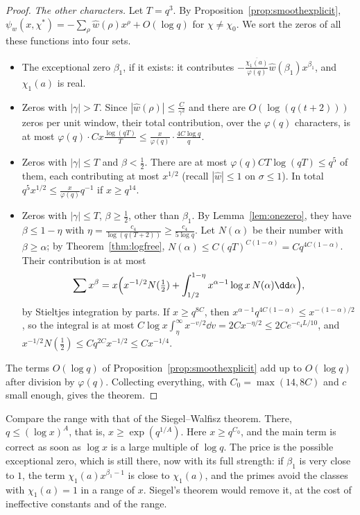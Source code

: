 \begin{proof}
\emph{The other characters.} Let $T=q^3$. By Proposition~\ref{prop:smoothexplicit}, $\psi_w(x,\chi^*)=-\sum_\rho\hat w(\rho)x^\rho+O(\log q)$ for $\chi\ne\chi_0$. We sort the zeros of all these functions into four sets.
\begin{itemize}
\item The exceptional zero $\beta_1$, if it exists: it contributes $-\frac{\overline{\chi_1(a)}}{\varphi(q)}\hat w(\beta_1)x^{\beta_1}$, and $\chi_1(a)$ is real.
\item Zeros with $|\gamma|>T$. Since $|\hat w(\rho)|\le\frac{C}{\gamma^2}$ and there are $O(\log(q(t+2)))$ zeros per unit window, their total contribution, over the $\varphi(q)$ characters, is at most $\varphi(q)\cdot Cx\frac{\log(qT)}T\le\frac x{\varphi(q)}\cdot\frac{4C\log q}q$.
\item Zeros with $|\gamma|\le T$ and $\beta<\frac12$. There are at most $\varphi(q)CT\log(qT)\le q^5$ of them, each contributing at most $x^{1/2}$ (recall $|\hat w|\le1$ on $\sigma\le1$). In total $q^5x^{1/2}\le\frac x{\varphi(q)}q^{-1}$ if $x\ge q^{14}$.
\item Zeros with $|\gamma|\le T$, $\beta\ge\frac12$, other than $\beta_1$. By Lemma~\ref{lem:onezero}, they have $\beta\le1-\eta$ with $\eta=\frac{c_4}{\log(q(T+2))}\ge\frac{c_4}{5\log q}$. Let $N(\alpha)$ be their number with $\beta\ge\alpha$; by Theorem~\ref{thm:logfree}, $N(\alpha)\le C(qT)^{C(1-\alpha)}=Cq^{4C(1-\alpha)}$. Their contribution is at most
\[
\sum x^\beta=x\Bigl(x^{-1/2}N(\tfrac12)+\int_{1/2}^{1-\eta}x^{\alpha-1}\log x\,N(\alpha)\dd\alpha\Bigr),
\]
by Stieltjes integration by parts. If $x\ge q^{8C}$, then $x^{\alpha-1}q^{4C(1-\alpha)}\le x^{-(1-\alpha)/2}$, so the integral is at most $C\log x\int_\eta^\infty x^{-v/2}\dd v=2Cx^{-\eta/2}\le2Ce^{-c_4L/10}$, and $x^{-1/2}N(\frac12)\le Cq^{2C}x^{-1/2}\le Cx^{-1/4}$.
\end{itemize}
The terms $O(\log q)$ of Proposition~\ref{prop:smoothexplicit} add up to $O(\log q)$ after division by $\varphi(q)$. Collecting everything, with $C_0=\max(14,8C)$ and $c$ small enough, gives the theorem.
\end{proof}

Compare the range with that of the Siegel--Walfisz theorem. There, $q\le(\log x)^A$, that is, $x\ge\exp(q^{1/A})$. Here $x\ge q^{C_0}$, and the main term is correct as soon as $\log x$ is a large multiple of $\log q$. The price is the possible exceptional zero, which is still there, now with its full strength: if $\beta_1$ is very close to $1$, the term $\chi_1(a)x^{\beta_1-1}$ is close to $\chi_1(a)$, and the primes avoid the classes with $\chi_1(a)=1$ in a range of $x$. Siegel's theorem would remove it, at the cost of ineffective constants and of the range.

